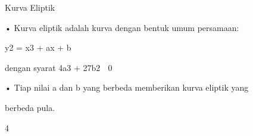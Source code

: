 \documentclass{article}
\begin{document}

Kurva Eliptik

• Kurva eliptik adalah kurva dengan bentuk umum persamaan: 


y2 = x3 + ax + b 

 dengan syarat 4a3 + 27b2  0

• Tiap nilai a dan b yang berbeda memberikan kurva eliptik yang 

berbeda pula.

4
\end{document}
